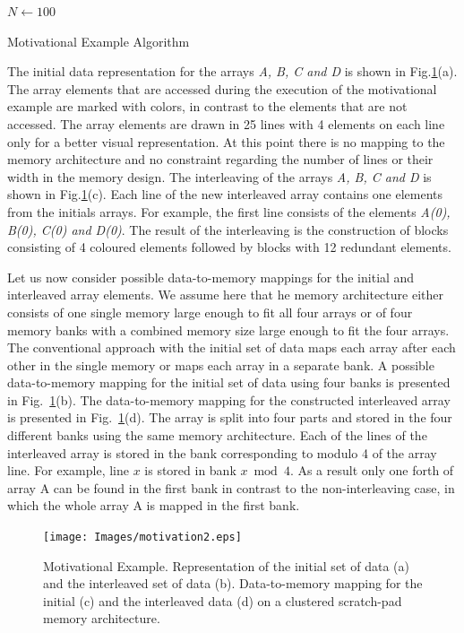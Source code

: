\documentclass[prodmode,acmtecs]{acmsmall}
\begin{document}
\begin{algorithm}[t]
\SetAlgoNoLine
$N \leftarrow 100$ \newline
{}
\caption{Motivational Example Algorithm}
\label{alg:motivation}
\end{algorithm}

The initial data representation for the arrays \textit{A, B, C and D} is shown in Fig.\ref{fig:motivation}(a). 
The array elements that are accessed during the execution of the motivational example are marked with colors, in contrast to the elements that are not accessed.
The array elements are drawn in 25 lines with 4 elements on each line only for a better visual representation.
At this point there is no mapping to the memory architecture and no constraint regarding the number of lines or their width in the memory design.
The interleaving of the arrays \textit{A, B, C and D} is shown in Fig.\ref{fig:motivation}(c). 
Each line of the new interleaved array contains one elements from the initials arrays.
For example, the first line consists of the elements \textit{A(0), B(0), C(0) and D(0)}. 
The result of the interleaving is the construction of blocks consisting of 4 coloured elements followed by blocks with 12 redundant elements.

Let us now consider possible data-to-memory mappings for the initial and interleaved array elements.
We assume here that he memory architecture either consists of one single memory large enough to fit all four arrays or of four memory banks with a combined memory size large enough to fit the four arrays.
The conventional approach with the initial set of data maps each array after each other in the single memory or maps each array in a separate bank.
A possible data-to-memory mapping for the initial set of data using four banks is presented in Fig.~\ref{fig:motivation}(b). 
The data-to-memory mapping for the constructed interleaved array is presented in Fig.~\ref{fig:motivation}(d).
The array is split into four parts and stored in the four different banks using the same memory architecture.
Each of the lines of the interleaved array is stored in the bank corresponding to modulo 4 of the array line.
For example, line $x$ is stored in bank $x \bmod 4$.
As a result only one forth of array A can be found in the first bank in contrast to the non-interleaving case, in which the whole array A is mapped in the first bank.

\begin{figure}
\centering
	\texttt{[image: Images/motivation2.eps]}
	\caption{Motivational Example. Representation of the initial set of data (a) and the interleaved set of data (b). Data-to-memory mapping for the initial (c) and the interleaved data (d) on a clustered scratch-pad memory architecture.}	
	\label{fig:motivation}
\end{figure}
\end{document}
